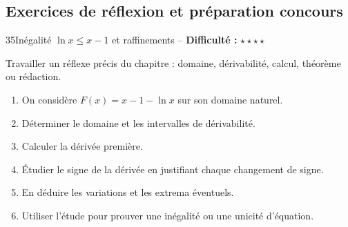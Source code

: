 \documentclass[11pt,a4paper]{article}
\newcommand{\etoiles}[1]{\textbf{Difficulté :} #1}
\begin{document}
\subsection{Exercices de réflexion et préparation concours}

\begin{exobox}{35}{Inégalité $\ln x\le x-1$ et raffinements -- \etoiles{$\star\star\star\star$}}

\begin{objectifbox}
Travailler un réflexe précis du chapitre : domaine, dérivabilité, calcul, théorème ou rédaction.
\end{objectifbox}

\begin{enumerate}

\item On considère $F(x)=x-1-\ln x$ sur son domaine naturel.

\item Déterminer le domaine et les intervalles de dérivabilité.

\item Calculer la dérivée première.

\item Étudier le signe de la dérivée en justifiant chaque changement de signe.

\item En déduire les variations et les extrema éventuels.

\item Utiliser l'étude pour prouver une inégalité ou une unicité d'équation.

\end{enumerate}

\end{exobox}
\end{document}
